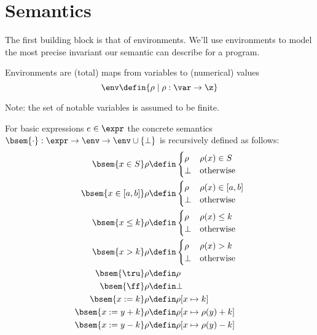 \section{Semantics}

The first building block is that of environments. We'll use
environments to model the most precise invariant our semantic can
describe for a program.

\begin{definition}[Environments]
  Environments are (total) maps from variables to (numerical)
  values \[\env \defin \{\rho \mid \rho : \var \to \z\}\]

  Note: the set of notable variables is assumed to be finite.
\end{definition}

\begin{definition}
  For basic expressions \(e \in \expr\) the concrete semantics \(\bsem{
    \cdot} : \expr \to \env \to \env \cup \{\bot\}\) is recursively
  defined as follows:
  \begin{align*}
    \bsem{ x\in S} \rho & \defin \begin{cases} \rho & \rho(x)\in S \\ \bot & \text{otherwise} \end{cases} \\
    \bsem{ x\in [a,b]} \rho & \defin \begin{cases} \rho & \rho(x)\in [a,b] \\ \bot & \text{otherwise} \end{cases} \\
    \bsem{ x \leq k} \rho & \defin \begin{cases} \rho & \rho(x)\leq k \\ \bot & \text{otherwise} \end{cases} \\
    \bsem{ x > k} \rho & \defin \begin{cases} \rho & \rho(x) > k \\ \bot & \text{otherwise} \end{cases} \\
    \bsem{ \tru} \rho & \defin \rho \\
    \bsem{ \ff} \rho & \defin \bot \\
    \bsem{ x := k} \rho & \defin \rho [x \mapsto k] \\
    \bsem{ x := y + k} \rho & \defin \rho [x \mapsto \rho(y) + k] \\
    \bsem{ x := y - k} \rho & \defin \rho [x \mapsto \rho(y) - k] \\
  \end{align*}
\end{definition}

